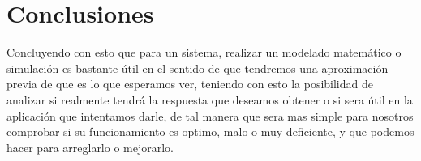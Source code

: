 \documentclass[letterpaper,spanish,12pt]{report}
\begin{document}
\chapter{Conclusiones}
Concluyendo con esto que para un sistema, realizar un modelado matem\'atico o simulaci\'on es bastante \'util en el sentido de que tendremos una aproximaci\'on previa de que es lo que esperamos ver, teniendo con esto la posibilidad de analizar si realmente tendr\'a la respuesta que deseamos obtener o si sera \'util en la aplicaci\'on que intentamos darle, de tal manera que sera mas simple para nosotros comprobar si su funcionamiento es optimo, malo o muy deficiente, y que podemos hacer para arreglarlo o mejorarlo.
\end{document}

